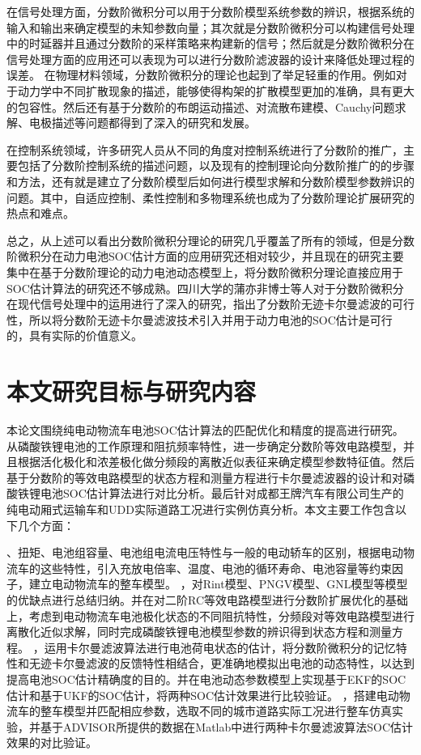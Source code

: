 在信号处理方面，分数阶微积分可以用于分数阶模型系统参数的辨识，根据系统的输入和输出来确定模型的未知参数向量；其次就是分数阶微积分可以构建信号处理中的时延器并且通过分数阶的采样策略来构建新的信号；然后就是分数阶微积分在信号处理方面的应用还可以表现为可以进行分数阶滤波器的设计来降低处理过程的误差。
在物理材料领域，分数阶微积分的理论也起到了举足轻重的作用。例如对于动力学中不同扩散现象的描述，能够使得构架的扩散模型更加的准确，具有更大的包容性。然后还有基于分数阶的布朗运动描述、对流散布建模、Cauchy问题求解、电极描述等问题都得到了深入的研究和发展。

在控制系统领域，许多研究人员从不同的角度对控制系统进行了分数阶的推广，主要包括了分数阶控制系统的描述问题，以及现有的控制理论向分数阶推广的的步骤和方法，还有就是建立了分数阶模型后如何进行模型求解和分数阶模型参数辨识的问题。其中，自适应控制、柔性控制和多物理系统也成为了分数阶理论扩展研究的热点和难点。

总之，从上述可以看出分数阶微积分理论的研究几乎覆盖了所有的领域，但是分数阶微积分在动力电池SOC估计方面的应用研究还相对较少，并且现在的研究主要集中在基于分数阶理论的动力电池动态模型上，将分数阶微积分理论直接应用于SOC估计算法的研究还不够成熟。四川大学的蒲亦非博士等人对于分数阶微积分在现代信号处理中的运用进行了深入的研究，指出了分数阶无迹卡尔曼滤波的可行性，所以将分数阶无迹卡尔曼滤波技术引入并用于动力电池的SOC估计是可行的，具有实际的价值意义。
\section{本文研究目标与研究内容}
本论文围绕纯电动物流车电池SOC估计算法的匹配优化和精度的提高进行研究。从磷酸铁锂电池的工作原理和阻抗频率特性，进一步确定分数阶等效电路模型，并且根据活化极化和浓差极化做分频段的离散近似表征来确定模型参数特征值。然后基于分数阶的等效电路模型的状态方程和测量方程进行卡尔曼滤波器的设计和对磷酸铁锂电池SOC估计算法进行对比分析。最后针对成都王牌汽车有限公司生产的纯电动厢式运输车和UDD实际道路工况进行实例仿真分析。本文主要工作包含以下几个方面：
\begin{enumerate}
、扭矩、电池组容量、电池组电流电压特性与一般的电动轿车的区别，根据电动物流车的这些特性，引入充放电倍率、温度、电池的循环寿命、电池容量等约束因子，建立电动物流车的整车模型。
，对Rint模型、PNGV模型、GNL模型等模型的优缺点进行总结归纳。并在对二阶RC等效电路模型进行分数阶扩展优化的基础上，考虑到电动物流车电池极化状态的不同阻抗特性，分频段对等效电路模型进行离散化近似求解，同时完成磷酸铁锂电池模型参数的辨识得到状态方程和测量方程。
，运用卡尔曼滤波算法进行电池荷电状态的估计，将分数阶微积分的记忆特性和无迹卡尔曼滤波的反馈特性相结合，更准确地模拟出电池的动态特性，以达到提高电池SOC估计精确度的目的。并在电池动态参数模型上实现基于EKF的SOC估计和基于UKF的SOC估计，将两种SOC估计效果进行比较验证。
，搭建电动物流车的整车模型并匹配相应参数，选取不同的城市道路实际工况进行整车仿真实验，并基于ADVISOR所提供的数据在Matlab中进行两种卡尔曼滤波算法SOC估计效果的对比验证。
\end{enumerate}

